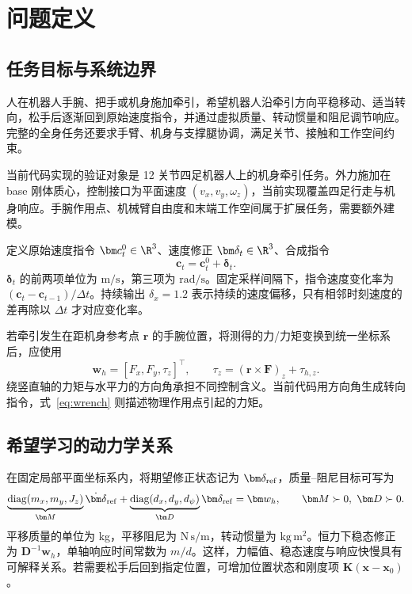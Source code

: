\section{问题定义}
\subsection{任务目标与系统边界}
人在机器人手腕、把手或机身施加牵引，希望机器人沿牵引方向平稳移动、适当转向，松手后逐渐回到原始速度指令，并通过虚拟质量、转动惯量和阻尼调节响应。完整的全身任务还要求手臂、机身与支撑腿协调，满足关节、接触和工作空间约束。

当前代码实现的验证对象是 12 关节四足机器人上的机身牵引任务。外力施加在 base 刚体质心，控制接口为平面速度 $(v_x,v_y,\omega_z)$，当前实现覆盖四足行走与机身响应。手腕作用点、机械臂自由度和末端工作空间属于扩展任务，需要额外建模。

定义原始速度指令 $\bm c^0_t\in\R^3$、速度修正 $\bm\delta_t\in\R^3$、合成指令
\begin{equation}
\bm c_t=\bm c^0_t+\bm\delta_t.
\label{eq:compose}
\end{equation}
$\bm\delta_t$ 的前两项单位为 $\mathrm{m/s}$，第三项为 $\mathrm{rad/s}$。固定采样间隔下，指令速度变化率为 $(\bm c_t-\bm c_{t-1})/\Delta t$。持续输出 $\delta_x=1.2$ 表示持续的速度偏移，只有相邻时刻速度的差再除以 $\Delta t$ 才对应变化率。

若牵引发生在距机身参考点 $\bm r$ 的手腕位置，将测得的力/力矩变换到统一坐标系后，应使用
\begin{equation}
\bm w_h=[F_x,F_y,\tau_z]^\top,
\qquad \tau_z=(\bm r\times\bm F)_z+\tau_{h,z}.
\label{eq:wrench}
\end{equation}
绕竖直轴的力矩与水平力的方向角承担不同控制含义。当前代码用方向角生成转向指令，式~\eqref{eq:wrench} 则描述物理作用点引起的力矩。

\subsection{希望学习的动力学关系}
在固定局部平面坐标系内，将期望修正状态记为 $\bm\delta_{\rm ref}$，质量--阻尼目标可写为
\begin{equation}
\underbrace{\operatorname{diag}(m_x,m_y,J_z)}_{\bm M}
\dot{\bm\delta}_{\rm ref}
+\underbrace{\operatorname{diag}(d_x,d_y,d_\psi)}_{\bm D}
\bm\delta_{\rm ref}=\bm w_h,
\qquad \bm M\succ0,\ \bm D\succ0.
\label{eq:admittance}
\end{equation}
平移质量的单位为 kg，平移阻尼为 $\mathrm{N\,s/m}$，转动惯量为 $\mathrm{kg\,m^2}$。恒力下稳态修正为 $\bm D^{-1}\bm w_h$，单轴响应时间常数为 $m/d$。这样，力幅值、稳态速度与响应快慢具有可解释关系。若需要松手后回到指定位置，可增加位置状态和刚度项 $\bm K(\bm x-\bm x_0)$。

